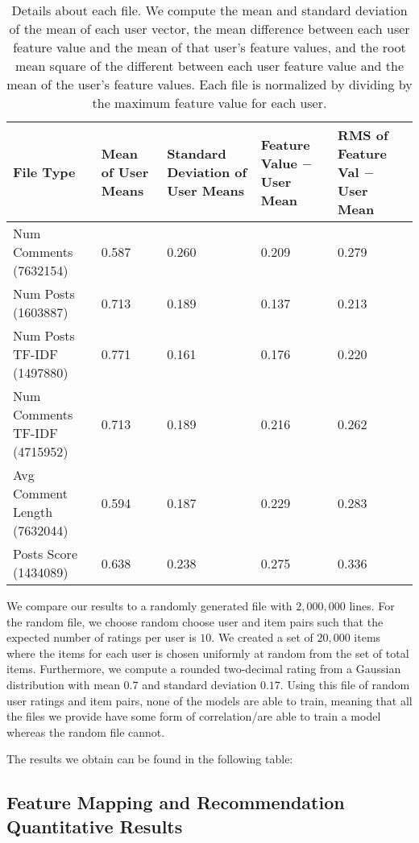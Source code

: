 \documentclass{article}
\begin{document}
\begin{table}
    \begin{tabular}{ |p{2.5cm}|p{2cm}|p{3cm}|p{3cm}|p{2.5cm}|}
    \hline
    File Type& Mean of User Means & Standard Deviation of User Means & Feature Value $-$ User Mean & RMS of Feature Val $-$ User Mean\\ \hline\hline
    Num Comments (7632154)& 0.587 & 0.260 & 0.209 & 0.279 \\ \hline
    Num Posts (1603887)& 0.713 & 0.189 & 0.137 & 0.213 \\ \hline
    Num Posts TF-IDF (1497880) & 0.771 & 0.161 &  0.176 & 0.220 \\ \hline
    Num Comments TF-IDF (4715952) & 0.713 & 0.189 & 0.216 & 0.262 \\ \hline
    Avg Comment Length (7632044) & 0.594 & 0.187 & 0.229 & 0.283 \\ \hline
    Posts Score (1434089) & 0.638 & 0.238 & 0.275 & 0.336 \\
    \hline
    \end{tabular}
    \caption{Details about each file. We compute the mean and standard deviation of the mean of each user vector,
     the mean difference between each user feature value and the mean of that user's feature values, and the root mean
     square of the different between each user feature value and the mean of the user's feature values. 
     Each file is normalized by dividing by the maximum feature value for each user.}\label{dataset-chars}
\end{table}

We compare our results to a randomly generated file with $2,000,000$ lines. For the random file, we choose random 
choose user and item pairs such that the expected number of ratings per user is $10$. We created a set of $20,000$ items
where the items for each user is chosen uniformly at random from the set of total items. Furthermore, we compute a 
rounded two-decimal rating from a Gaussian distribution with mean $0.7$ and standard deviation $0.17$. Using this
file of random user ratings and item pairs, none of the models are able to train, meaning that all the files
we provide have some form of correlation/are able to train a model whereas the random file cannot.

The results we obtain can be found in the following table:

\subsection{Feature Mapping and Recommendation Quantitative Results}\label{sec:feature-mapping}
\end{document}

